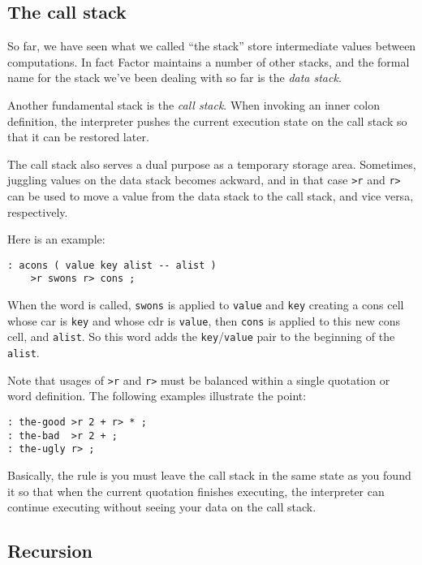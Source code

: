 \documentclass[english]{article}
\begin{document}
{\subsection{The call stack}

So far, we have seen what we called ``the stack'' store intermediate values between computations. In fact Factor maintains a number of other stacks, and the formal name for the stack we've been dealing with so far is the \emph{data stack}.

Another fundamental stack is the \emph{call stack}. When invoking an inner colon definition, the interpreter pushes the current execution state on the call stack so that it can be restored later.

The call stack also serves a dual purpose as a temporary storage area. Sometimes, juggling values on the data stack becomes ackward, and in that case \texttt{>r} and \texttt{r>} can be used to move a value from the data stack to the call stack, and vice versa, respectively.

Here is an example:

\begin{verbatim}
: acons ( value key alist -- alist )
    >r swons r> cons ;
\end{verbatim}

When the word is called, \texttt{swons} is applied to \texttt{value} and \texttt{key} creating a cons cell whose car is \texttt{key} and whose cdr is \texttt{value}, then \texttt{cons} is applied to this new cons cell, and \texttt{alist}. So this word adds the \texttt{key}/\texttt{value} pair to the beginning of the \texttt{alist}.

Note that usages of \texttt{>r} and \texttt{r>} must be balanced within a single quotation or word definition. The following examples illustrate the point:

\begin{verbatim}
: the-good >r 2 + r> * ;
: the-bad  >r 2 + ;
: the-ugly r> ;
\end{verbatim}

Basically, the rule is you must leave the call stack in the same state as you found it so that when the current quotation finishes executing, the interpreter can continue executing without seeing your data on the call stack.

\subsection{Recursion}

}
\end{document}
